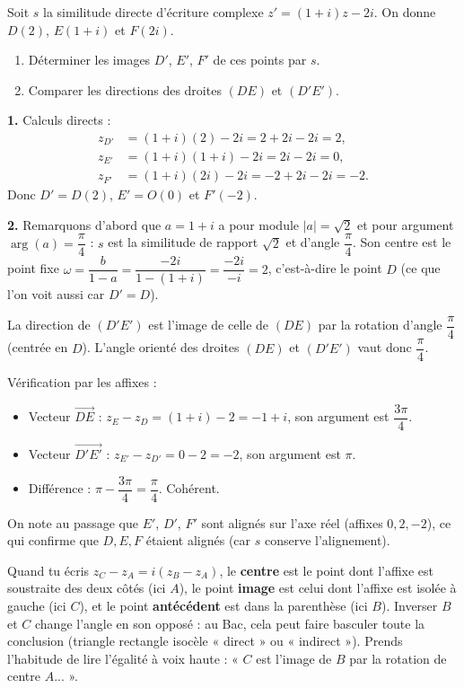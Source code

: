 \documentclass[11pt]{article}
\begin{document}
\begin{exoresolu}
Soit $s$ la similitude directe d'écriture complexe $z' = (1 + i)z - 2i$. On donne $D(2)$, $E(1 + i)$ et $F(2i)$.
\begin{enumerate}
\item Déterminer les images $D'$, $E'$, $F'$ de ces points par $s$.
\item Comparer les directions des droites $(DE)$ et $(D'E')$.
\end{enumerate}
\tcblower
\textbf{1.} Calculs directs :
\begin{align*}
z_{D'} &= (1+i)(2) - 2i = 2 + 2i - 2i = 2,\\
z_{E'} &= (1+i)(1+i) - 2i = 2i - 2i = 0,\\
z_{F'} &= (1+i)(2i) - 2i = -2 + 2i - 2i = -2.
\end{align*}
Donc $D' = D(2)$, $E' = O(0)$ et $F'(-2)$.

\textbf{2.} Remarquons d'abord que $a = 1+i$ a pour module $|a| = \sqrt{2}$ et pour argument $\arg(a) = \dfrac{\pi}{4}$ : $s$ est la similitude de rapport $\sqrt{2}$ et d'angle $\dfrac{\pi}{4}$. Son centre est le point fixe $\omega = \dfrac{b}{1-a} = \dfrac{-2i}{1-(1+i)} = \dfrac{-2i}{-i} = 2$, c'est-à-dire le point $D$ (ce que l'on voit aussi car $D'=D$).

La direction de $(D'E')$ est l'image de celle de $(DE)$ par la rotation d'angle $\dfrac{\pi}{4}$ (centrée en $D$). L'angle orienté des droites $(DE)$ et $(D'E')$ vaut donc $\dfrac{\pi}{4}$.

Vérification par les affixes :
\begin{itemize}
\item Vecteur $\overrightarrow{DE}$ : $z_E - z_D = (1+i) - 2 = -1 + i$, son argument est $\dfrac{3\pi}{4}$.
\item Vecteur $\overrightarrow{D'E'}$ : $z_{E'} - z_{D'} = 0 - 2 = -2$, son argument est $\pi$.
\item Différence : $\pi - \dfrac{3\pi}{4} = \dfrac{\pi}{4}$. Cohérent.
\end{itemize}
On note au passage que $E'$, $D'$, $F'$ sont alignés sur l'axe réel (affixes $0, 2, -2$), ce qui confirme que $D, E, F$ étaient alignés (car $s$ conserve l'alignement).
\end{exoresolu}

\begin{attention}
Quand tu écris $z_C - z_A = i(z_B - z_A)$, le \textbf{centre} est le point dont l'affixe est soustraite des deux côtés (ici $A$), le point \textbf{image} est celui dont l'affixe est isolée à gauche (ici $C$), et le point \textbf{antécédent} est dans la parenthèse (ici $B$). Inverser $B$ et $C$ change l'angle en son opposé : au Bac, cela peut faire basculer toute la conclusion (triangle rectangle isocèle « direct » ou « indirect »). Prends l'habitude de lire l'égalité à voix haute : « $C$ est l'image de $B$ par la rotation de centre $A$... ».
\end{attention}
\end{document}
